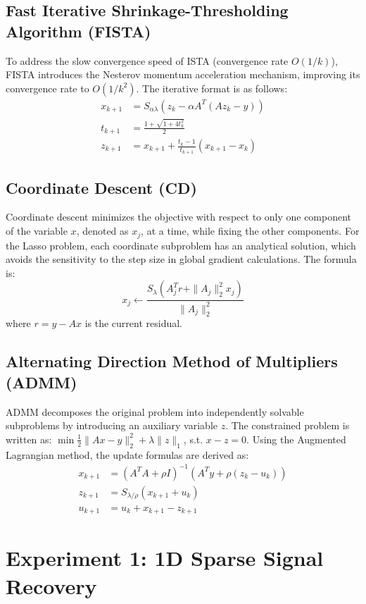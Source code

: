 \documentclass[12pt, a4paper]{article}
\begin{document}
\subsection{Fast Iterative Shrinkage-Thresholding Algorithm (FISTA)}
To address the slow convergence speed of ISTA (convergence rate $O(1/k)$), FISTA introduces the Nesterov momentum acceleration mechanism, improving its convergence rate to $O(1/k^2)$. The iterative format is as follows:
\begin{align}
    x_{k+1} &= S_{\alpha\lambda}\left( z_k - \alpha A^T(Az_k - y) \right) \\
    t_{k+1} &= \frac{1 + \sqrt{1 + 4t_k^2}}{2} \\
    z_{k+1} &= x_{k+1} + \frac{t_k - 1}{t_{k+1}}(x_{k+1} - x_k)
\end{align}

\subsection{Coordinate Descent (CD)}
Coordinate descent minimizes the objective with respect to only one component of the variable $x$, denoted as $x_j$, at a time, while fixing the other components. For the Lasso problem, each coordinate subproblem has an analytical solution, which avoids the sensitivity to the step size in global gradient calculations. The formula is:
\begin{equation}
    x_j \leftarrow \frac{S_{\lambda}(A_j^T r + \|A_j\|_2^2 x_j)}{\|A_j\|_2^2}
\end{equation}
where $r = y - Ax$ is the current residual.

\subsection{Alternating Direction Method of Multipliers (ADMM)}
ADMM decomposes the original problem into independently solvable subproblems by introducing an auxiliary variable $z$. The constrained problem is written as: $\min \frac{1}{2}\|Ax - y\|_2^2 + \lambda\|z\|_1$, s.t. $x - z = 0$. Using the Augmented Lagrangian method, the update formulas are derived as:
\begin{align}
    x_{k+1} &= (A^TA + \rho I)^{-1}(A^Ty + \rho(z_k - u_k)) \\
    z_{k+1} &= S_{\lambda/\rho}(x_{k+1} + u_k) \\
    u_{k+1} &= u_k + x_{k+1} - z_{k+1}
\end{align}

\section{Experiment 1: 1D Sparse Signal Recovery}
\end{document}
